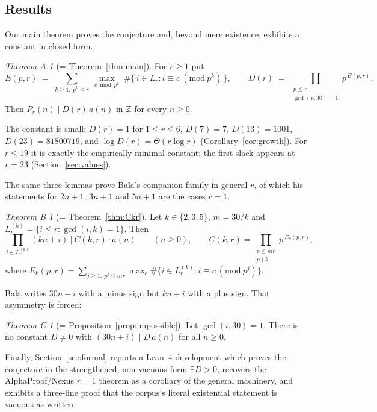 \documentclass[11pt]{article}
\theoremstyle{plain}
\theoremstyle{definition}
\theoremstyle{remark}
\newtheorem*{theoremA}{Theorem A}
\newtheorem*{theoremB}{Theorem B}
\newtheorem*{theoremC}{Theorem C}
\numberwithin{equation}{section}
\newcommand{\Z}{\mathbb{Z}}
\newcommand{\Lr}{L_r}
\begin{document}
\subsection{Results}

Our main theorem proves the conjecture and, beyond mere existence, exhibits a constant in closed
form.

\begin{theoremA}[= Theorem~\ref{thm:main}]
For $r \ge 1$ put
\[
  E(p,r) \;=\; \sum_{k \ge 1,\ p^k \le r}\ \max_{c \bmod p^k}\
    \#\{\, i \in \Lr : i \equiv c \ (\mathrm{mod}\ p^k) \,\},
  \qquad
  D(r) \;=\; \prod_{\substack{p \le r \\ \gcd(p,30)=1}} p^{\,E(p,r)} .
\]
Then $P_r(n) \mid D(r)\, a(n)$ in $\Z$ for every $n \ge 0$.
\end{theoremA}

The constant is small: $D(r) = 1$ for $1 \le r \le 6$, $D(7) = 7$, $D(13) = 1001$,
$D(23) = 81800719$, and $\log D(r) = \Theta(r \log r)$ (Corollary~\ref{cor:growth}). For
$r \le 19$ it is exactly the empirically minimal constant; the first slack appears at $r = 23$
(Section~\ref{sec:values}).

The same three lemmas prove Bala's companion family in general $r$, of which his statements for
$2n+1$, $3n+1$ and $5n+1$ are the cases $r=1$.

\begin{theoremB}[= Theorem~\ref{thm:Ckr}]
Let $k \in \{2,3,5\}$, $m = 30/k$ and $L^{(k)}_r = \{ i \le r : \gcd(i,k) = 1\}$. Then
\[
  \prod_{i \in L^{(k)}_r} (kn + i) \ \Big|\ C(k,r)\cdot a(n)
  \qquad (n \ge 0),
  \qquad
  C(k,r) = \prod_{\substack{p \le mr\\ p \nmid k}} p^{\,E_k(p,r)},
\]
where $E_k(p,r) = \sum_{j \ge 1,\ p^j \le mr} \max_c \#\{ i \in L^{(k)}_r : i \equiv c \
(\mathrm{mod}\ p^j)\}$.
\end{theoremB}

Bala writes $30n - i$ with a minus sign but $kn + i$ with a plus sign. That asymmetry is forced:

\begin{theoremC}[= Proposition~\ref{prop:impossible}]
Let $\gcd(i,30) = 1$. There is no constant $D \ne 0$ with $(30n + i) \mid D\,a(n)$ for all
$n \ge 0$.
\end{theoremC}

Finally, Section~\ref{sec:formal} reports a Lean~4 development which proves the conjecture in the
strengthened, non-vacuous form $\exists D > 0$, recovers the AlphaProof/Nexus $r=1$ theorem as a
corollary of the general machinery, and exhibits a three-line proof that the corpus's literal
existential statement is vacuous as written.
\end{document}
